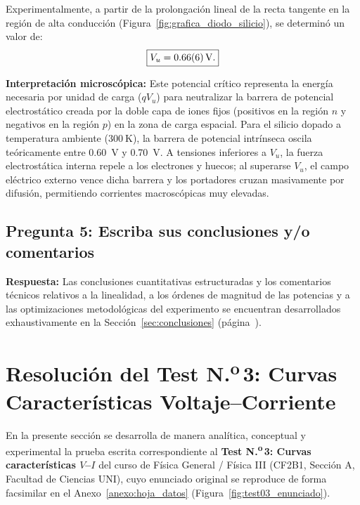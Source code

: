 \begin{appendices}
Experimentalmente, a partir de la prolongación lineal de la recta tangente en la región de alta conducción (Figura~\ref{fig:grafica_diodo_silicio}), se determinó un valor de:
\begin{equation}
    \boxed{V_u = \qty{0,66 \pm 0,06}{\volt}.}
\end{equation}

\textbf{Interpretación microscópica:}  
Este potencial crítico representa la energía necesaria por unidad de carga ($q V_u$) para neutralizar la barrera de potencial electrostático creada por la doble capa de iones fijos (positivos en la región $n$ y negativos en la región $p$) en la zona de carga espacial. Para el silicio dopado a temperatura ambiente ($\qty{300}{\kelvin}$), la barrera de potencial intrínseca oscila teóricamente entre \qty{0,60}{\volt} y \qty{0,70}{\volt}. A tensiones inferiores a $V_u$, la fuerza electrostática interna repele a los electrones y huecos; al superarse $V_u$, el campo eléctrico externo vence dicha barrera y los portadores cruzan masivamente por difusión, permitiendo corrientes macroscópicas muy elevadas.

\subsection{Pregunta 5: Escriba sus conclusiones y/o comentarios}
\textbf{Respuesta:}  
Las conclusiones cuantitativas estructuradas y los comentarios técnicos relativos a la linealidad, a los órdenes de magnitud de las potencias y a las optimizaciones metodológicas del experimento se encuentran desarrollados exhaustivamente en la Sección~\ref{sec:conclusiones} (página~\pageref{sec:conclusiones}).

\section{Resolución del Test \texorpdfstring{N.\textsuperscript{o}\,3}{Nro. 3}: Curvas Características Voltaje--Corriente}
\label{anexo:test03}

En la presente sección se desarrolla de manera analítica, conceptual y experimental la prueba escrita correspondiente al \textbf{Test \texorpdfstring{N.\textsuperscript{o}\,3}{Nro. 3}: Curvas características $V$--$I$} del curso de Física General / Física III (CF2B1, Sección A, Facultad de Ciencias UNI), cuyo enunciado original se reproduce de forma facsimilar en el Anexo~\ref{anexo:hoja_datos} (Figura~\ref{fig:test03_enunciado}).


\end{appendices}
